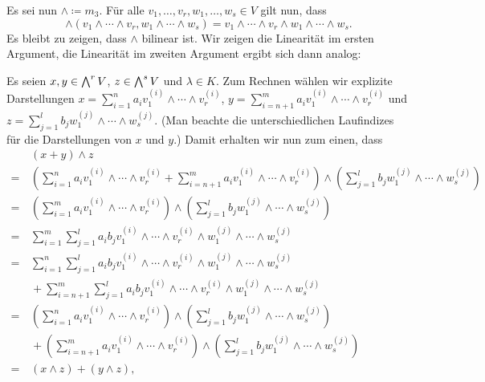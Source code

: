 Es sei nun $\wedge \coloneqq m_3$.
Für alle $v_1, \dotsc, v_r, w_1, \dotsc, w_s \in V$ gilt nun, dass
\[
    \wedge( v_1 \wedge \dotsb \wedge v_r, w_1 \wedge \dotsb \wedge w_s )
  = v_1 \wedge \dotsb \wedge v_r \wedge w_1 \wedge \dotsb \wedge w_s.
\]
Es bleibt zu zeigen, dass $\wedge$ bilinear ist.
Wir zeigen die Linearität im ersten Argument, die Linearität im zweiten Argument ergibt sich dann analog:

Es seien $x, y \in \bigwedge^{r} V$, $z \in \bigwedge^{s} V$ und $\lambda \in K$.
Zum Rechnen wählen wir explizite Darstellungen $x = \sum_{i=1}^n a_i v^{(i)}_1 \wedge \dotsb \wedge v^{(i)}_r$, $y = \sum_{i=n+1}^m a_i v^{(i)}_1 \wedge \dotsb \wedge v^{(i)}_r$ und $z = \sum_{j=1}^l b_j w^{(j)}_1 \wedge \dotsb \wedge w^{(j)}_s$. (Man beachte die unterschiedlichen Laufindizes für die Darstellungen von $x$ und $y$.)
Damit erhalten wir nun zum einen, dass
\begin{align*}
   &\,  (x + y) \wedge z
  \\
  =&\,  \left(
            \sum_{i=1}^n a_i v^{(i)}_1 \wedge \dotsb \wedge v^{(i)}_r
          + \sum_{i=n+1}^m a_i v^{(i)}_1 \wedge \dotsb \wedge v^{(i)}_r
        \right)
        \wedge
        \left(
          \sum_{j=1}^l b_j w^{(j)}_1 \wedge \dotsb \wedge w^{(j)}_s
        \right)
  \\
  =&\,  \left(
          \sum_{i=1}^m a_i v^{(i)}_1 \wedge \dotsb \wedge v^{(i)}_r
        \right)
        \wedge
        \left(
          \sum_{j=1}^l b_j w^{(j)}_1 \wedge \dotsb \wedge w^{(j)}_s
        \right)
  \\
  =&\,  \sum_{i=1}^m \sum_{j=1}^l a_i b_j v^{(i)}_1 \wedge \dotsb \wedge v^{(i)}_r \wedge w^{(j)}_1 \wedge \dotsb \wedge w^{(j)}_s
  \\
  =&\,    \sum_{i=1}^n \sum_{j=1}^l a_i b_j v^{(i)}_1 \wedge \dotsb \wedge v^{(i)}_r \wedge w^{(j)}_1 \wedge \dotsb \wedge w^{(j)}_s
  \\
   &\,  + \sum_{i=n+1}^m \sum_{j=1}^l a_i b_j v^{(i)}_1 \wedge \dotsb \wedge v^{(i)}_r \wedge w^{(j)}_1 \wedge \dotsb \wedge w^{(j)}_s
  \\
  =&\,  \left(
          \sum_{i=1}^n a_i v^{(i)}_1 \wedge \dotsb \wedge v^{(i)}_r
        \right)
        \wedge
        \left(
          \sum_{j=1}^l b_j w^{(j)}_1 \wedge \dotsb \wedge w^{(j)}_s
        \right)
  \\
   &\,  +
        \left(
          \sum_{i=n+1}^m a_i v^{(i)}_1 \wedge \dotsb \wedge v^{(i)}_r
        \right)
        \wedge
        \left(
          \sum_{j=1}^l b_j w^{(j)}_1 \wedge \dotsb \wedge w^{(j)}_s
        \right)
  \\
  =&\,  (x \wedge z) + (y \wedge z),
\end{align*}
